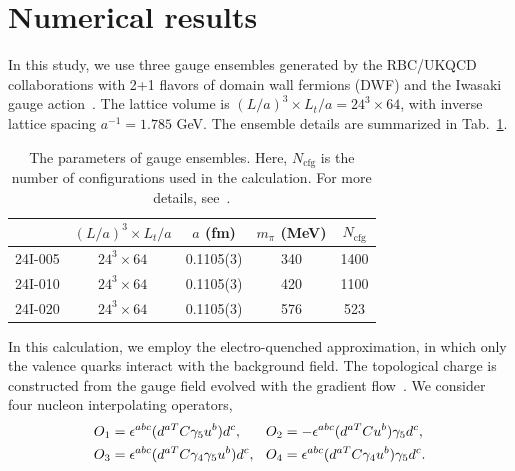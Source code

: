 \documentclass[aps,prl,twocolumn,superscriptaddress,nofootinbib]{revtex4-2}
\begin{document}
\section{Numerical results}
In this study, we use three gauge ensembles generated by the RBC/UKQCD collaborations with 2+1 flavors of domain wall fermions (DWF) 
and the Iwasaki gauge action~\cite{Allton:2008pn}. The lattice volume is $(L/a)^3\times L_t/a=24^3\times64$, with 
inverse lattice spacing $a^{-1}=1.785$ GeV. 
The ensemble details are summarized in Tab.~\ref{Tab:ensembles}.
\begin{table}[t]
	\caption{\label{Tab:ensembles}
	The parameters of gauge ensembles. Here, $N_\text{cfg}$ is the number of configurations used in the calculation. For more details, see~\cite{Allton:2008pn}.}
	\begin{ruledtabular}
		\begin{tabular}{c c c c c }
			\text{ensemble} & $(L/a)^3 \times L_t/a$   &  $a$ (fm)   & $m_\pi$ (MeV) &   $N_\text{cfg}$\\
			\hline
			24I-005             & $24^3 \times 64$ & 0.1105(3)   & 340       &  1400\\
            \hline
            24I-010             & $24^3 \times 64$ & 0.1105(3)   & 420       & 1100  \\
	        \hline
            24I-020             & $24^3 \times 64$ & 0.1105(3)   & 576       & 523
		\end{tabular}
	\end{ruledtabular}
\end{table}

In this calculation, we employ the 
electro-quenched approximation, in which only the valence quarks interact with the background field. The topological charge is constructed from the gauge field evolved with the gradient flow~\cite{Luscher:2010iy,Luscher:2011bx}.
We consider four nucleon interpolating operators,
\begin{equation}
\label{eqn:nucleon_ops}
\begin{aligned}
O_1 &= \epsilon^{abc}(d^{aT}C\gamma_5u^b)d^c,
&\hspace{-0.1em}
O_2 &= -\epsilon^{abc}(d^{aT}Cu^b)\gamma_5d^c,\\
O_3 &= \epsilon^{abc}(d^{aT}C\gamma_4\gamma_5u^b)d^c,
&\hspace{-0.1em}
O_4 &= \epsilon^{abc}(d^{aT}C\gamma_4u^b)\gamma_5d^c .
\end{aligned}
\end{equation}
\end{document}
